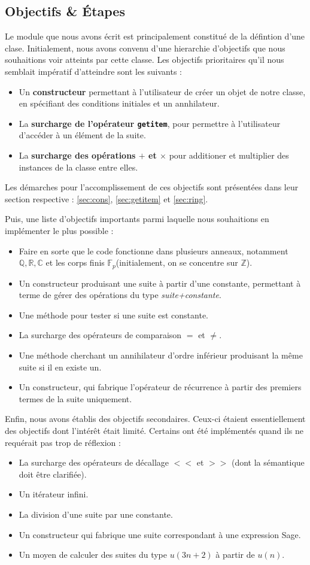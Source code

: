 \documentclass[12pt]{article}
\newlength{\charwidth}
\newcommand{\uline}{\underline{\hspace{2\charwidth}}}
\newcommand{\itemV}{\item[{\color{green} \ding{51}}]}
\newcommand{\itemX}{\item[{\color{red} \ding{55}}]}
\begin{document}
    \subsection{Objectifs \& Étapes}
        Le module que nous avons écrit est principalement constitué de la défintion
        d'une clase.
        Initialement, nous avons convenu d'une hierarchie d'objectifs que nous souhaitions 
        voir atteints par cette classe.
        Les objectifs prioritaires qu'il nous semblait impératif d'atteindre sont les
        suivants :
        \begin{itemize}
            \itemV Un \textbf{constructeur} permettant à l'utilisateur de créer un objet de notre classe,
                en spécifiant des conditions initiales et un annhilateur.
            \itemV La \textbf{surcharge de l'opérateur \texttt{\uline getitem\uline}}, pour permettre à
                l'utilisateur d'accéder à un élément de la suite.
            \itemV La \textbf{surcharge des opérations $+$ et $\times$} pour additioner et multiplier des
                instances de la classe entre elles.
        \end{itemize}
        Les démarches pour l'accomplissement de ces objectifs sont présentées dans leur section 
        respective : \ref{sec:cons}, \ref{sec:getitem} et \ref{sec:ring}.\\
        \par Puis, une liste d'objectifs importants parmi laquelle nous souhaitions en implémenter le plus
        possible :
        \begin{itemize}
            \itemV Faire en sorte que le code fonctionne dans plusieurs anneaux, notamment
                $\mathbb{Q,R,C}$ et les corps finis $\mathbb F_p$(initialement, on se 
                concentre sur $\mathbb Z$).
            \itemV Un constructeur produisant une suite à partir d'une constante, permettant à terme
                de gérer des opérations du type \emph{suite+constante}.
            \itemX Une méthode pour tester si une suite est constante.
            \itemX La surcharge des opérateurs de comparaison $=$ et $\ne$.
            \itemX Une méthode cherchant un annihilateur d'ordre inférieur produisant la même suite
                si il en existe un.
            \itemX Un constructeur, qui fabrique l'opérateur de récurrence à partir des 
                premiers termes de la suite uniquement.
        \end{itemize} \bigskip
        \par Enfin, nous avons établis des objectifs secondaires. Ceux-ci étaient essentiellement
        des objectifs dont l'intérêt était limité. Certains ont été implémentés quand ils
        ne requérait pas trop de réflexion : 
        \begin{itemize}
            \itemX La surcharge des opérateurs de décallage $<<$ et $>>$ (dont la sémantique doit
                être clarifiée).
            \itemV Un itérateur infini.
            \itemX La division d'une suite par une constante.
            \itemX Un constructeur qui fabrique une suite correspondant à une expression Sage.
            \itemX Un moyen de calculer des suites du type $u(3n+2)$ à partir de $u(n)$.
        \end{itemize}
\end{document}
